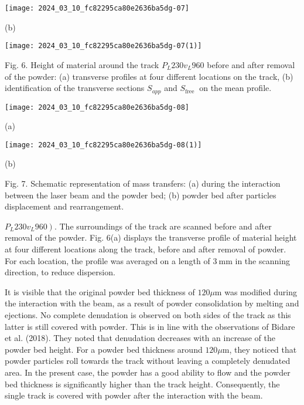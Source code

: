 \documentclass[10pt]{article}
\begin{document}
\begin{center}
\texttt{[image: 2024\_03\_10\_fc82295ca80e2636ba5dg-07]}
\end{center}

(b)

\begin{center}
\texttt{[image: 2024\_03\_10\_fc82295ca80e2636ba5dg-07(1)]}
\end{center}

Fig. 6. Height of material around the track $P_{L} 230 v_{L} 960$ before and after removal of the powder: (a) transverse profiles at four different locations on the track, (b) identification of the transverse sections $S_{a p p}$ and $S_{\text {free }}$ on the mean profile.

\begin{center}
\texttt{[image: 2024\_03\_10\_fc82295ca80e2636ba5dg-08]}
\end{center}

(a)

\begin{center}
\texttt{[image: 2024\_03\_10\_fc82295ca80e2636ba5dg-08(1)]}
\end{center}

(b)

Fig. 7. Schematic representation of mass transfers: (a) during the interaction between the laser beam and the powder bed; (b) powder bed after particles displacement and rearrangement.

$\left.P_{L} 230 v_{L} 960\right)$. The surroundings of the track are scanned before and after removal of the powder. Fig. 6(a) displays the transverse profile of material height at four different locations along the track, before and after removal of powder. For each location, the profile was averaged on a length of $3 \mathrm{~mm}$ in the scanning direction, to reduce dispersion.

It is visible that the original powder bed thickness of $120 \mu \mathrm{m}$ was modified during the interaction with the beam, as a result of powder consolidation by melting and ejections. No complete denudation is observed on both sides of the track as this latter is still covered with powder. This is in line with the observations of Bidare et al. (2018). They noted that denudation decreases with an increase of the powder bed height. For a powder bed thickness around $120 \mu \mathrm{m}$, they noticed that powder particles roll towards the track without leaving a completely denudated area. In the present case, the powder has a good ability to flow and the powder bed thickness is significantly higher than the track height. Consequently, the single track is covered with powder after the interaction with the beam.
\end{document}
